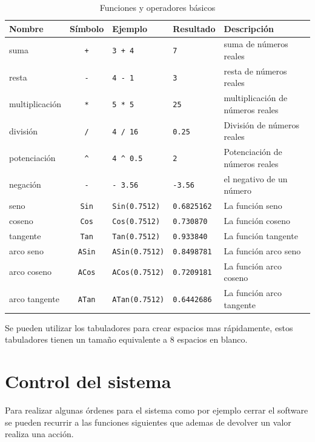       \begin{longtable}[c]{|l|c|l|l|l|}
         \caption{Funciones y operadores básicos}\label{tb:basicopr} \\ \hline
         {\bf Nombre}           & {\bf Símbolo} & {\bf Ejemplo} & {\bf Resultado}  & {\bf Descripción}\\ \hline
         suma           & \texttt{+} & \texttt{3 + 4} & \texttt{7}  & suma de números reales\\ \hline
         resta          & \texttt{-} & \texttt{4 - 1} & \texttt{3}  & resta de números reales\\ \hline
         multiplicación & \texttt{*} & \texttt{5 * 5} & \texttt{25}  & multiplicación de números reales\\ \hline
         división       & \texttt{/} & \texttt{4 / 16} & \texttt{0.25}  & División de números reales\\ \hline
         potenciación   & \texttt{\^} & \texttt{4~\^~0.5} & \texttt{2}  & Potenciación de números reales\\ \hline
         negación   & \texttt{-} & \texttt{- 3.56} & \texttt{-3.56}  & el negativo de un número\\ \hline
         seno & \texttt{Sin} & \texttt{Sin(0.7512)} & \texttt{0.6825162} & La función seno \\ \hline
         coseno & \texttt{Cos} & \texttt{Cos(0.7512)} & \texttt{0.730870} & La función coseno \\ \hline
         tangente & \texttt{Tan} & \texttt{Tan(0.7512)} & \texttt{0.933840} & La función tangente \\ \hline
         arco seno & \texttt{ASin} & \texttt{ASin(0.7512)} & \texttt{0.8498781} & La función arco seno \\ \hline
         arco coseno & \texttt{ACos} & \texttt{ACos(0.7512)} & \texttt{0.7209181} & La función arco coseno \\ \hline
         arco tangente & \texttt{ATan} & \texttt{ATan(0.7512)} & \texttt{0.6442686} & La función arco tangente \\ \hline
      \end{longtable}
      
      Se pueden utilizar los tabuladores para crear espacios mas rápidamente, estos tabuladores tienen un tamaño equivalente a 8 espacios en blanco.
      
   \section{Control del sistema}
      Para realizar algunas órdenes para el sistema como por ejemplo cerrar el software se pueden recurrir a las funciones siguientes que ademas de devolver un valor realiza una acción.
      
